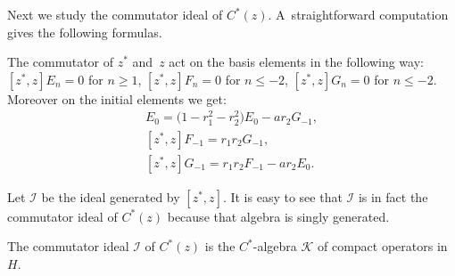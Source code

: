 Next we study the commutator ideal of $C^*(z)$.
A~straightforward computation gives the following formulas.

\begin{Lemma}
\label{commutator_calculation}
The commutator of $z^*$ and~$z$ act on the basis elements in the following way: $[z^*,z]E_n=0$ for $n\ge 1$,
$[z^*,z]F_n=0$ for $n\le -2$, $[z^*,z]G_n =0$ for $n\le -2$.
Moreover on the initial elements we get:
\begin{gather*}
 [z^*,z]E_0=\big(1-r_1^2-r_2^2\big)E_0-ar_2G_{-1},
\\
 [z^*,z]F_{-1} =r_1r_2G_{-1},
\\
 [z^*,z]G_{-1} =r_1r_2F_{-1}-ar_2E_0.
\end{gather*}
\end{Lemma}

Let $\mathcal{I}$ be the ideal generated by $[z^*,z]$.
It is easy to see that $\mathcal{I}$ is in fact the commutator ideal of $C^*(z)$ because that algebra is singly generated.

\begin{Theorem}%
The commutator ideal $\mathcal{I}$ of $C^*(z)$ is the $C^*$-algebra $\mathcal{K}$ of compact operators in~$H$.
\end{Theorem}

